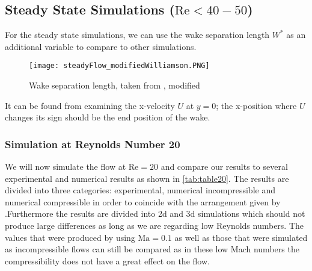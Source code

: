 	\subsection{Steady State Simulations ($\text{Re} < 40-50$)}
	For the steady state simulations, we can use the wake separation length $W^*$ as an additional variable to compare to other simulations.
			\begin{figure}[htp]
				\centering
				\texttt{[image: steadyFlow\_modifiedWilliamson.PNG]}
				\caption{Wake separation length, taken from \cite{williamson1996vortex}, modified }
				\label{fig:wakeSeparation}
			\end{figure} 
	It can be found from examining the x-velocity $U$ at $y=0$; the x-position where $U$ changes its sign should be the end position of the wake.

	\subsubsection{Simulation at Reynolds Number 20}
	We will now simulate the flow at $\text{Re}=20$ and compare our results to several experimental and numerical results as shown in \cref{tab:table20}. The results are divided into three categories: experimental, numerical incompressible and numerical compressible in order to coincide with the arrangement given by \textcite{ayers}.Furthermore the results are divided into \gls{2d} and \gls{3d} simulations which should not produce large differences as long as we are regarding low Reynolds numbers. The values that were produced by \textcite{brehm2015locally} using $\text{Ma} = 0.1$ as well as those that were simulated as incompressible flows can still be compared as in these low Mach numbers the compressibility does not have a great effect on the flow.

